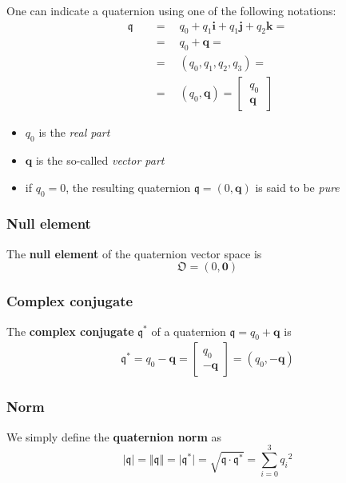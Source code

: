 One can indicate a quaternion using one of the following notations:
{\large{
    \begin{align*}
        \mathfrak{q} \quad &= \quad q_0+q_1\mathbf{i}+q_1\mathbf{j}+q_2\mathbf{k}=\\
                     &= \quad q_0+\mathbf{q}=\\
                     &=\quad (q_0, q_1, q_2, q_3)=\\
                     &=\quad  (q_0, \mathbf{q})=\begin{bmatrix}
                        \ q_0 \ \\\ \mathbf{q} \
                     \end{bmatrix}
    \end{align*}
}}

\begin{itemize}
    \itemsep0em
    \item $q_0$ is the \textit{real part}
    \item $\mathbf{q}$ is the so-called \textit{vector part}
    \item if $q_0=0$, the resulting quaternion $\mathfrak{q}=(0,\mathbf{q})$ is said to be \textit{pure}
\end{itemize}

{\color{red} \subsubsection*{Null element}}
\noindent
The \textbf{null element} of the quaternion vector space is
{\Large{
    \begin{equation*}
        \mathfrak{O} = (0, \mathbf{0})
    \end{equation*}
}
}

{\color{red} \subsubsection*{Complex conjugate}}
\noindent
The \textbf{complex conjugate} $\mathfrak{q}^*$ of a quaternion $\mathfrak{q}=q_0+\mathbf{q}$ is
{\Large{
    \begin{align*}
        \mathfrak{q}^*=q_0-\mathbf{q}=\begin{bmatrix}
            q_0\\-\mathbf{q}
        \end{bmatrix}=(q_0, -\mathbf{q})
    \end{align*}
}} 

{\color{red} \subsubsection*{Norm}}
\noindent
We simply define the \textbf{quaternion norm} as
{\Large{
    \begin{equation*}
        \vert \mathfrak{q} \vert = \Vert \mathfrak{q} \Vert = \vert \mathfrak{q}^* \vert=\sqrt{\mathfrak{q} \cdot \mathfrak{q}^* }=
        \sum_{i=0}^3 {q_i}^2
    \end{equation*}
}}


